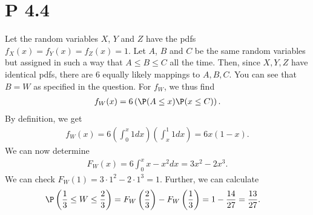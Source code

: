 \documentclass{article}
\begin{document}
\section*{P 4.4}


Let the random variables $X$, $Y$ and $Z$ have
the pdfs $f_X(x)=f_Y(x)=f_Z(x)=1$. Let $A$, $B$ and $C$
be the same random variables but assigned in such a way that
$A\leq B\leq C$ all the time. Then, since $X,Y,Z$ have identical pdfs,
there are $6$ equally likely mappings to $A,B,C$.
You can see that $B=W$ as specified in the question. For $f_W$,
we thus find
\begin{align*}
  f_W(x) = 6\left(\P(A \leq x)\P(x \leq C)\right).
\end{align*}
By definition, we get
\begin{align*}
  f_W(x) = 6\left(\int_0^x 1dx\right)\left(\int_x^1 1dx\right) = 6x(1-x).
\end{align*}
We can now determine
\begin{align*}
  F_W(x) = 6\int_0^x x - x^2 dx = 3x^2-2x^3.
\end{align*}
We can check $F_W(1) = 3\cdot 1^2 - 2 \cdot 1^3 = 1$. Further, we can
calculate
\begin{align*}
  \P\left(\frac{1}{3}\leq W \leq \frac{2}{3}\right)
   & = F_W\left(\frac{2}{3}\right) - F_W\left(\frac{1}{3}\right)
  = 1 - \frac{14}{27} = \frac{13}{27}.
\end{align*}
\end{document}
